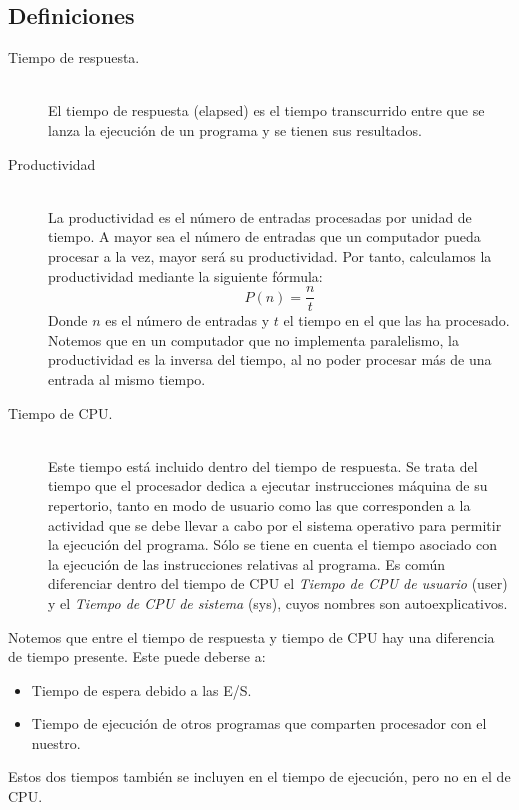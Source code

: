\subsection{Definiciones}
\begin{description}
    \item [Tiempo de respuesta.]~\\
        El tiempo de respuesta (elapsed) es el tiempo transcurrido entre que se lanza la ejecución de un programa y se tienen sus resultados.
    \item [Productividad]~\\
        La productividad es el número de entradas procesadas por unidad de tiempo. A mayor sea el número de entradas que un computador pueda procesar a la vez, mayor será su productividad. Por tanto, calculamos la productividad mediante la siguiente fórmula:
        \begin{equation}
            P(n) = \dfrac{n}{t}
        \end{equation}
        Donde $n$ es el número de entradas y $t$ el tiempo en el que las ha procesado. Notemos que en un computador que no implementa paralelismo, la productividad es la inversa del tiempo, al no poder procesar más de una entrada al mismo tiempo.
    \item [Tiempo de CPU.]~\\
        Este tiempo está incluido dentro del tiempo de respuesta. Se trata del tiempo que el procesador dedica a ejecutar instrucciones máquina de su repertorio, tanto en modo de usuario como las que corresponden a la actividad que se debe llevar a cabo por el sistema operativo para permitir la ejecución del programa. Sólo se tiene en cuenta el tiempo asociado con la ejecución de las instrucciones relativas al programa. Es común diferenciar dentro del tiempo de CPU el \emph{Tiempo de CPU de usuario} (user) y el \emph{Tiempo de CPU de sistema} (sys), cuyos nombres son autoexplicativos.
\end{description}
Notemos que entre el tiempo de respuesta y tiempo de CPU hay una diferencia de tiempo presente. Este puede deberse a:
\begin{itemize}
    \item Tiempo de espera debido a las E/S.
    \item Tiempo de ejecución de otros programas que comparten procesador con el nuestro.
\end{itemize}
Estos dos tiempos también se incluyen en el tiempo de ejecución, pero no en el de CPU.

